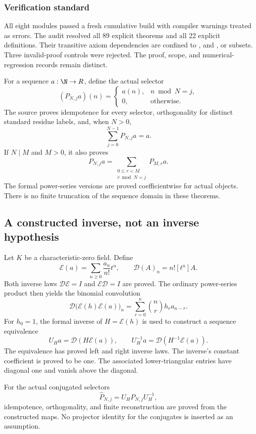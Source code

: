 \subsubsection*{Verification standard}
All eight modules passed a fresh cumulative build with compiler warnings treated as errors. The audit resolved all 89 explicit theorems and all 22 explicit definitions. Their transitive axiom dependencies are confined to ,  and , or subsets. Three invalid-proof controls were rejected. The proof, scope, and numerical-regression records remain distinct.
\par\medskip
{}
For a sequence $a:\N\to R$, define the actual selector
\[
 (P_{N,j}a)(n)=\begin{cases}a(n),&n\bmod N=j,\\0,&\text{otherwise.}\end{cases}
\]
The source proves idempotence for every selector, orthogonality for distinct standard residue labels, and, when $N>0$,
\[
 \sum_{j=0}^{N-1}P_{N,j}a=a.
\]
If $N\mid M$ and $M>0$, it also proves
\[
 P_{N,j}a=\sum_{\substack{0\le r<M\\r\bmod N=j}}P_{M,r}a.
\]
The formal power-series versions are proved coefficientwise for actual  objects. There is no finite truncation of the sequence domain in these theorems.

\subsection*{A constructed inverse, not an inverse hypothesis}
Let $K$ be a characteristic-zero field. Define
\[
 \mathcal E(a)=\sum_{n\ge0}\frac{a_n}{n!}t^n,\qquad
 \mathcal D(A)_n=n![t^n]A.
\]
Both inverse laws $\mathcal D\mathcal E=I$ and $\mathcal E\mathcal D=I$ are proved. The ordinary power-series product then yields the binomial convolution
\[
 \mathcal D\bigl(\mathcal E(h)\mathcal E(a)\bigr)_n
 =\sum_{r=0}^{n}\binom nr h_r a_{n-r}.
\]
For $h_0=1$, the formal inverse of $H=\mathcal E(h)$ is used to construct a sequence equivalence
\[
 U_H a=\mathcal D(H\mathcal E(a)),\qquad
 U_H^{-1}a=\mathcal D(H^{-1}\mathcal E(a)).
\]
The equivalence has proved left and right inverse laws. The inverse's constant coefficient is proved to be one. The associated lower-triangular entries have diagonal one and vanish above the diagonal.

For the actual conjugated selectors
\[
 \widehat P_{N,j}=U_HP_{N,j}U_H^{-1},
\]
idempotence, orthogonality, and finite reconstruction are proved from the constructed maps. No projector identity for the conjugates is inserted as an assumption.

